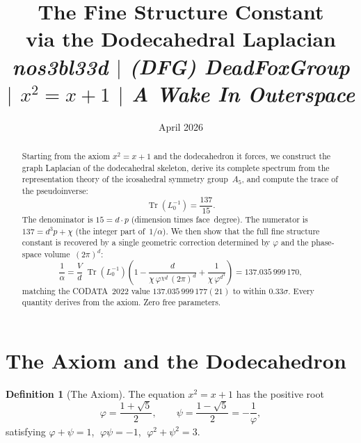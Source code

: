 \documentclass[11pt,a4paper]{article}
\theoremstyle{plain}
\theoremstyle{definition}
\newtheorem{definition}[theorem]{Definition}
\newcommand{\vp}{\varphi}
\newcommand{\ps}{\psi}
\DeclareMathOperator{\Tr}{Tr}
\begin{document}
\title{%
  \textbf{The Fine Structure Constant}\\[2pt]
  \textbf{via the Dodecahedral Laplacian}\\[8pt]
  \large\textit{nos3bl33d \;$\mid$\; (DFG) DeadFoxGroup
    \;$\mid$\; $x^{2} = x + 1$
    \;$\mid$\; A Wake In Outerspace}%
}
\author{}
\date{April 2026}

\maketitle

\begin{abstract}
Starting from the axiom $x^2 = x + 1$ and the dodecahedron it forces, we
construct the graph Laplacian of the dodecahedral skeleton, derive its
complete spectrum from the representation theory of the icosahedral
symmetry group~$A_5$, and compute the trace of the pseudoinverse:
\[
  \Tr(L_0^{-1}) = \frac{137}{15}.
\]
The denominator is $15 = d \cdot p$ (dimension times face~degree). The
numerator is $137 = d^3 p + \chi$ (the integer part of~$1/\alpha$).  We then
show that the full fine structure constant is recovered by a single
geometric correction determined by $\vp$ and the phase-space
volume~$(2\pi)^d$:
\[
  \frac{1}{\alpha}
  = \frac{V}{d}\;\Tr(L_0^{-1})\!\left(
      1 - \frac{d}{\chi\,\vp^{\chi d}\,(2\pi)^d}
      + \frac{1}{\chi\,\vp^{d^3}}
    \right)
  = 137.035\,999\,170,
\]
matching the CODATA~2022 value $137.035\,999\,177(21)$ to within
$0.33\sigma$.  Every quantity derives from the axiom.  Zero free
parameters.
\end{abstract}

\tableofcontents

\section{The Axiom and the Dodecahedron}\label{sec:axiom}

\begin{definition}[The Axiom]\label{def:axiom}
The equation $x^2 = x + 1$ has the positive root
\[
  \vp = \frac{1+\sqrt{5}}{2}, \qquad
  \ps = \frac{1-\sqrt{5}}{2} = -\frac{1}{\vp},
\]
satisfying $\vp + \ps = 1$, $\;\vp\ps = -1$, $\;\vp^2 + \ps^2 = 3$.
\end{definition}
\end{document}
